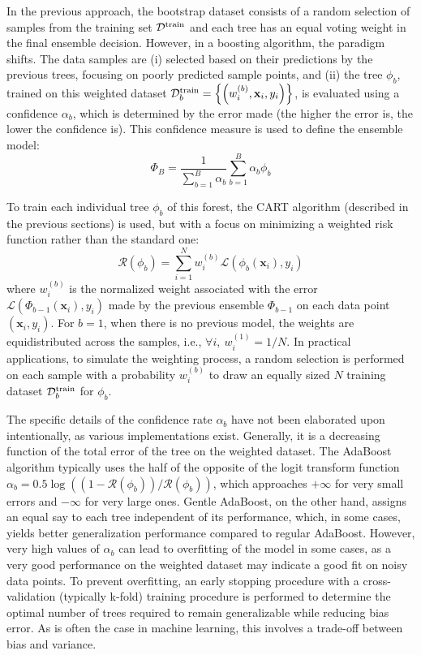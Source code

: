 \documentclass[main]{subfiles}
\begin{document}
In the previous approach, the bootstrap dataset consists of a random selection of samples from the training set $\mathcal{D}^{\text{train}}$ and each tree has an equal voting weight in the final ensemble decision. However, in a boosting algorithm,\autocite{drucker1997improving} the paradigm shifts. The data samples are (i) selected based on their predictions by the previous trees, focusing on poorly predicted sample points, and (ii) the tree $\phi_b$, trained on this weighted dataset $\mathcal{D}^{\text{train}}_b=\left\{\left(w_i^{(b)},\mathbf{x}_i,y_i\right)\right\}$, is evaluated using a confidence $\alpha_b$, which is determined by the error made (the higher the error is, the lower the confidence is). This confidence measure is used to define the ensemble model:
\begin{equation}
  \Phi_B = \frac{1}{\sum_{b=1}^{B} \alpha_b}\sum_{b=1}^{B} \alpha_b\phi_b
\end{equation}

To train each individual tree $\phi_b$ of this forest, the CART algorithm (described in the previous sections) is used, but with a focus on minimizing a weighted risk function rather than the standard one:
\begin{equation}
  \mathcal{R}(\phi_b) = \sum_{i=1}^N w_i^{(b)} \mathcal{L}\left(\phi_b(\mathbf{x}_i),y_i\right)
\end{equation}
where $w_i^{(b)}$ is the normalized weight associated with the error $\mathcal{L}\left(\Phi_{b-1}(\mathbf{x}_i),y_i\right)$ made by the previous ensemble $\Phi_{b-1}$ on each data point $\left(\mathbf{x}_i,y_i\right)$. For $b=1$, when there is no previous model, the weights are equidistributed across the samples, i.e., $\forall i,\ w_i^{(1)}=1/N$. In practical applications, to simulate the weighting process, a random selection is performed on each sample with a probability $w_i^{(b)}$ to draw an equally sized $N$ training dataset $\mathcal{D}^{\text{train}}_b$ for $\phi_b$. 

The specific details of the confidence rate $\alpha_b$ have not been elaborated upon intentionally, as various implementations exist. Generally, it is a decreasing function of the total error of the tree on the weighted dataset. The AdaBoost algorithm typically uses the half of the opposite of the logit transform function $\alpha_b=0.5\log\left((1-\mathcal{R}(\phi_b))/\mathcal{R}(\phi_b)\right)$, which approaches $+\infty$ for very small errors and $-\infty$ for very large ones.\autocite{Freund_1997,schapire2013explaining} Gentle AdaBoost, on the other hand, assigns an equal say to each tree independent of its performance, which, in some cases, yields better generalization performance compared to regular AdaBoost. However, very high values of $\alpha_b$ can lead to overfitting of the model in some cases, as a very good performance on the weighted dataset may indicate a good fit on noisy data points.\autocite{schapire1998improved} To prevent overfitting, an early stopping procedure with a cross-validation (typically k-fold) training procedure is performed to determine the optimal number of trees required to remain generalizable while reducing bias error. As is often the case in machine learning, this involves a trade-off between bias and variance.
\end{document}
